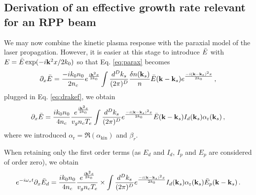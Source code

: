 \documentclass[
 reprint,
 amsmath,amssymb,
 aps,
]{revtex4-1}
\begin{document}
\subsection{Derivation of an effective growth rate relevant for an  RPP beam}
 \begin{widetext}
We may now combine the kinetic plasma response  with the paraxial model of  the laser propagation. 
However, it  is easier at this stage to introduce $\Bar{E}$ with  $E=\Bar{E}\exp(-i \mathbf{k}^2x /2k_0)$ so that Eq. \eqref{eq:parax} becomes
\begin{equation}
    \partial_x \Bar{E}  =\frac{-ik_0n_0}{2n_c} e^{\frac{i\mathbf{k}^2x }{2k_0}}\int \frac{d^Dk_s}{(2\pi)^D} \frac{\delta n(\mathbf{k}_s)}{n} \Bar{E}(\mathbf{k}-\mathbf{k}_s) e^{ \frac{-i(\mathbf{k}-\mathbf{k}_s)^2x}{2k_0}}\, ,  \label{eq:paraxbar}
\end{equation}
 plugged in Eq. \eqref{eq:drakef}, we obtain
\begin{align}
    \partial_x \Bar{E}  =\frac{ik_0n_0}{4n_c} \frac{e^{\frac{i\mathbf{k}^2 x}{2k_0}}}{  v_g n_c T_e}
    \int \frac{d^Dk_s}{(2\pi)^D}  e^{ \frac{-i(\mathbf{k}-\mathbf{k}_s)^2x}{2k_0}} \Bar{E}(\mathbf{k}-\mathbf{k}_s) 
   I_d(\mathbf{k}_s) \alpha_\mathrm{r}   (\mathbf{k}_s) \, ,  \label{eq:paraxbar}
\end{align}
where we introduced $\alpha_\mathrm{r}=\Re(\alpha_\mathrm{kin} )$ and $\beta_r$. 

 When retaining only the first order terms (as $E_d$ and $I_d$, $I_p$ and $E_p$ are considered of order zero), we obtain 
 \begin{align}
   e^{-i\omega_s t}\partial_x \Bar{E}_d  =\frac{ik_0n_0}{4n_c} \frac{e^{\frac{i\mathbf{k}^2 x}{2k_0}}}{  v_g n_c T_e} \times 
   \int \frac{d^Dk_s}{(2\pi)^D} 
   e^{ \frac{-i(\mathbf{k}-\mathbf{k}_s)^2x}{2k_0}}
   I_d(\mathbf{k}_s) \alpha_\mathrm{r}   (\mathbf{k}_s) \Bar{E}_p(\mathbf{k}-\mathbf{k}_s) 
   \, .  \label{eq:paraxbar}
\end{align}


\end{widetext}
\end{document}
